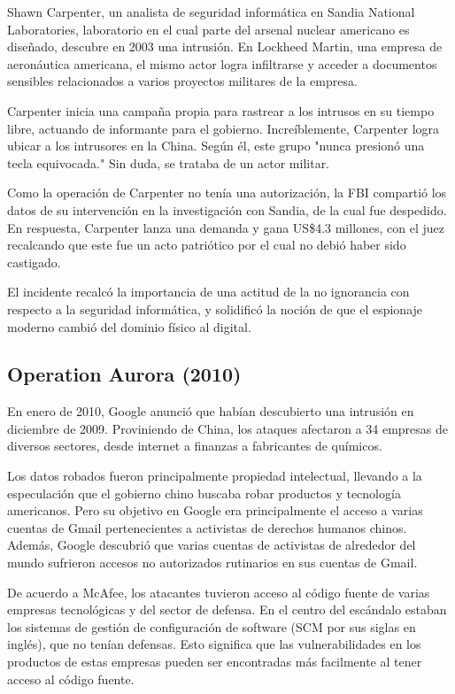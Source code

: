 \documentclass{article}
\begin{document}
Shawn Carpenter, un analista de seguridad informática en Sandia National Laboratories, laboratorio en el cual parte del arsenal nuclear americano es diseñado, descubre en 2003 una intrusión. En Lockheed Martin, una empresa de aeronáutica americana, el mismo actor logra infiltrarse y acceder a documentos sensibles relacionados a varios proyectos militares de la empresa.

Carpenter inicia una campaña propia para rastrear a los intrusos en su tiempo libre, actuando de informante para el gobierno. Increíblemente, Carpenter logra ubicar a los intrusores en la China. Según él, este grupo "nunca presionó una tecla equivocada." Sin duda, se trataba de un actor militar.\autocite{time-titan-rain} \autocite{homelandsecurity-titan-rain}

Como la operación de Carpenter no tenía una autorización, la FBI compartió los datos de su intervención en la investigación con Sandia, de la cual fue despedido. En respuesta, Carpenter lanza una demanda y gana US\$4.3 millones, con el juez recalcando que este fue un acto patriótico por el cual no debió haber sido castigado.

El incidente recalcó la importancia de una actitud de la no ignorancia con respecto a la seguridad informática, y solidificó la noción de que el espionaje moderno cambió del dominio físico al digital. \autocite{computerworld-titan-rain}

\subsection{Operation Aurora (2010)}
En enero de 2010, Google anunció que habían descubierto una intrusión en diciembre de 2009. Proviniendo de China, los ataques afectaron a 34 empresas de diversos sectores, desde internet a finanzas a fabricantes de químicos. 

Los datos robados fueron principalmente propiedad intelectual, llevando a la especulación que el gobierno chino buscaba robar productos y tecnología americanos. Pero su objetivo en Google era principalmente el acceso a varias cuentas de Gmail pertenecientes a activistas de derechos humanos chinos. Además, Google descubrió que varias cuentas de activistas de alrededor del mundo sufrieron accesos no autorizados rutinarios en sus cuentas de Gmail. \autocite{google-aurora}

De acuerdo a McAfee, los atacantes tuvieron acceso al código fuente de varias empresas tecnológicas y del sector de defensa. En el centro del escándalo estaban los sistemas de gestión de configuración de software (SCM por sus siglas en inglés), que no tenían defensas. Esto significa que las vulnerabilidades en los productos de estas empresas pueden ser encontradas más facilmente al tener acceso al código fuente. \autocite{wired-aurora}
\end{document}
